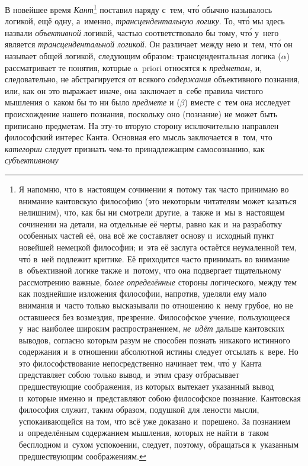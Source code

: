 В новейшее время {\em Кант}\footnote{
Я напомню, что в~настоящем сочинении я~потому так часто принимаю во
внимание кантовскую философию (это некоторым читателям может казаться
нелишним), что, как бы ни смотрели другие, а~также и~мы в~настоящем
сочинении на детали, на отдельные её черты, равно как и~на разработку
особенных частей её, она всё же составляет основу и~исходный пункт новейшей
немецкой философии; и~эта её заслуга остаётся неумаленной тем, чт\'{о} в~ней
подлежит критике. Её приходится часто принимать во внимание в~объективной
логике также и~потому, что она подвергает тщательному рассмотрению важные,
{\em более определённые} стороны логического, между тем как
позднейшие изложения философии, напротив, уделяли ему мало внимания и~часто
только высказывали по отношению к~нему грубое, но не оставшееся без
возмездия, презрение. Философское учение, пользующееся у~нас наиболее
широким распространением, {\em не~идёт} дальше кантовских
выводов, согласно которым разум не способен познать никакого истинного
содержания и~в отношении абсолютной истины следует отсылать к~вере. Но это
философствование непосредственно начинает тем, чт\'{о} у~Канта представляет
собою только вывод, и~этим сразу отбрасывает предшествующие соображения,
из которых вытекает указанный вывод и~которые именно и~представляют собою
философское познание. Кантовская философия служит, таким образом, подушкой
для лености мысли, успокаивающейся на том, что всё уже доказано и~порешено.
За познанием и~определённым содержанием мышления, которых не найти в~таком
бесплодном и~сухом успокоении, следует, поэтому, обращаться к~указанным
предшествующим соображениям.} поставил наряду с~тем,
чт\'{о} обычно называлось логикой, ещё одну, а~именно,
{\em трансцендентальную логику}. То, чт\'{о} мы здесь
назвали {\em объективной} логикой, частью
соответствовало бы тому, чт\'{о} у~него является
{\em трансцендентальной логикой}. Он различает между
нею и~тем, чт\'{о} он называет общей логикой, следующим образом:
трансцендентальная логика ($\alpha$) рассматривает те понятия, которые
a~priori относятся к {\em предметам,} и, следовательно,
не абстрагируется от всякого {\em содержания}
объективного познания, или, как он это выражает иначе, она заключает в~себе
правила чистого мышления о~каком бы то ни было
{\em предмете} и ($\beta$) вместе с~тем она исследует
происхождение нашего познания, поскольку оно (познание) не может быть
приписано предметам. На эту-то вторую сторону исключительно направлен
философский интерес Канта. Основная его мысль заключается в~том, что
{\em категории} следует признать чем-то принадлежащим
самосознанию, как {\em субъективному}

